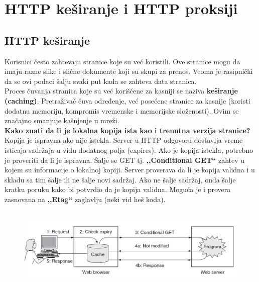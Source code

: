 \documentclass[a4paper]{article}
\begin{document}
\section{HTTP keširanje i HTTP proksiji}
    \subsection{HTTP keširanje}
        Korisnici često zahtevaju stranice koje su već koristili. Ove stranice mogu da imaju
        razne slike i slične dokumente koji su skupi za prenos. Veoma je rasipnički da se 
        ovi podaci šalju svaki put kada se zahteva data stranica. \\
        \indent Proces čuvanja stranica koje su već korišćene za kasniji se naziva \textbf{keširanje
        (caching)}. Pretraživač čuva određenje, već posećene stranice za kasnije (koristi dodatnu
        memoriju, kompromis vremenske i memorijske složenosti). Ovim se značajno 
        smanjuje kašnjenje u mreži. \\
        \indent \textbf{Kako znati da li je lokalna kopija ista kao i trenutna verzija stranice?}
        Kopija je ispravna ako nije istekla. Server u HTTP odgovoru dostavlja vreme isticaja sadržaja
        u vidu dodatnog polja (expires). Ako je kopija istekla, potrebno je proveriti 
        da li je ispravna. Šalje se GET tj. \textbf{,,Conditional GET``} 
        zahtev u kojem su informacije o lokalnoj kopiji. Server proverava da li je kopija validna 
        i u skladu sa tim šalje ili ne šalje novi sadržaj. Ako ne šalje sadržaj, onda šalje kratku
        poruku kako bi potvrdio da je kopija validna. Moguća je i provera zasnovana na 
        \textbf{,,Etag``} zaglavlju (neki vid heš koda).
        \begin{figure}[H]
            \begin{center}
                \includegraphics[width=120mm,height=40mm]{Slike/http8.png}
            \end{center}
        \end{figure}
    
\end{document}
